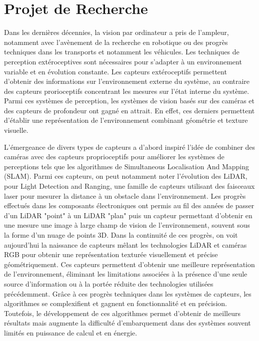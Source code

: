 
\section{Projet de Recherche}

Dans les dernières décennies, la vision par ordinateur a pris de l'ampleur, notamment avec l'avènement de la recherche en robotique ou des progrès techniques dans les transports et notamment les véhicules. Les techniques de perception extéroceptives sont nécessaires pour s'adapter à un environnement variable et en évolution constante. Les capteurs extéroceptifs permettent d'obtenir des informations sur l'environnement externe du système, au contraire des capteurs prorioceptifs concentrant les mesures sur l'état interne du système.
Parmi ces systèmes de perception, les systèmes de vision basés sur des caméras et des capteurs de profondeur ont gagné en attrait. En effet, ces derniers permettent d'établir une représentation de l'environnement combinant géométrie et texture visuelle.

L'émergeance de divers types de capteurs a d'abord inspiré l'idée de combiner des caméras avec des capteurs proprioceptifs pour améliorer les systèmes de perceptions tels que les algorithmes de Simultaneous Localisation And Mapping (SLAM). Parmi ces capteurs, on peut notamment noter l'évolution des LiDAR, pour Light Detection and Ranging, une famille de capteurs utilisant des faisceaux laser pour mesurer la distance à un obstacle dans l'environnement. Les progrès effectués dans les composants électroniques ont permis au fil des années de passer d'un LiDAR "point" à un LiDAR "plan" puis un capteur permettant d'obtenir en une mesure une image à large champ de vision de l'environnement, souvent sous la forme d'un nuage de points 3D. Dans la continuité de ces progrès, on voit aujourd'hui la naissance de capteurs mêlant les technologies LiDAR et caméras RGB pour obtenir une représentation texturée visuellement et précise géométriquement. Ces capteurs permettent d'obtenir une meilleure représentation de l'environnement, éliminant les limitations associées à la présence d'une seule source d'information ou à la portée réduite des technologies utilisées précédemment. Grâce à ces progrès techniques dans les systèmes de capteurs, les algorithmes se complexifient et gagnent en fonctionnalité et en précision. Toutefois, le développement de ces algorithmes permet d'obtenir de meilleurs résultats mais augmente la difficulté d'embarquement dans des systèmes souvent limités en puissance de calcul et en énergie.


